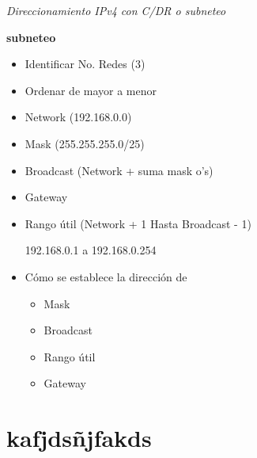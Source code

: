 \documentclass[11pt]{article}
\date{\today}
\title{}
\begin{document}
\tableofcontents

\emph{Direccionamiento IPv4 con C/DR o subneteo}

\textbf{\textbf{subneteo}}

\begin{itemize}
\item Identificar No. Redes (3)
\item Ordenar de mayor a menor
\end{itemize}


\begin{itemize}
\item Network (192.168.0.0)
\item Mask (255.255.255.0/25)
\item Broadcast (Network + suma mask o's)
\item Gateway
\item Rango útil (Network + 1 Hasta Broadcast - 1)

192.168.0.1 a 192.168.0.254
\end{itemize}



\begin{itemize}
\item Cómo se establece la dirección de
\begin{itemize}
\item Mask
\item Broadcast
\item Rango útil
\item Gateway
\end{itemize}
\end{itemize}
\section{kafjdsñjfakds}
\label{sec:orgecd409b}
\end{document}
